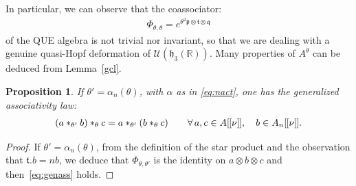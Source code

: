 \documentclass[10pt,a4paper]{amsart}
\numberwithin{equation}{section}
\newtheorem{prop}[thm]{Proposition}
\theoremstyle{definition}
\newcommand{\U}{\mathcal{U}}
\newcommand{\R}{\mathbb{R}}
\newcommand{\mf}{\mathfrak}
\newcommand{\lbrak}{[\hspace{-0.5pt}[}
\newcommand{\rbrak}{]\hspace{-0.5pt}]}
\newcommand{\ga}{\mf{p}}
\newcommand{\gb}{\mf{q}}
\newcommand{\gc}{\mf{t}}
\renewcommand{\hbar}{\nu}
\begin{document}
In particular, we can observe that the coassociator:
\begin{gather}\label{eq:coassociator}
\Phi_{\theta,\theta}=e^{\theta^2\ga \otimes \gc \otimes \gb}
\end{gather}
of the QUE algebra is not trivial nor invariant, so that we are dealing with a genuine quasi-Hopf deformation of $\U(\mf{h}_3(\R))$.
Many properties of $A^{\theta}$ can be deduced from Lemma~\ref{gcl}.


\begin{prop}\label{prop:gcl}
If $\theta'=\alpha_n(\theta)$, with $\alpha$ as in \eqref{eq:nact}, one has the generalized associativity law:
\begin{gather}\label{eq:genass}
(a\ast_{\theta'}b)\ast_\theta c=
a\ast_{\theta'}(b\ast_\theta c)
\qquad \forall\, a,c\in A\lbrak\hbar\rbrak,\quad b\in A_n\lbrak\hbar\rbrak.
\end{gather}
\end{prop}

\begin{proof}
If $\theta'=\alpha_n(\theta)$,
from the def\/inition of the star product and the observation that $\gc.b=nb$, we deduce that $\Phi_{\theta,\theta'}$ is the identity on $a\otimes b\otimes c$ and then~\eqref{eq:genass} holds.
\end{proof}
\end{document}
